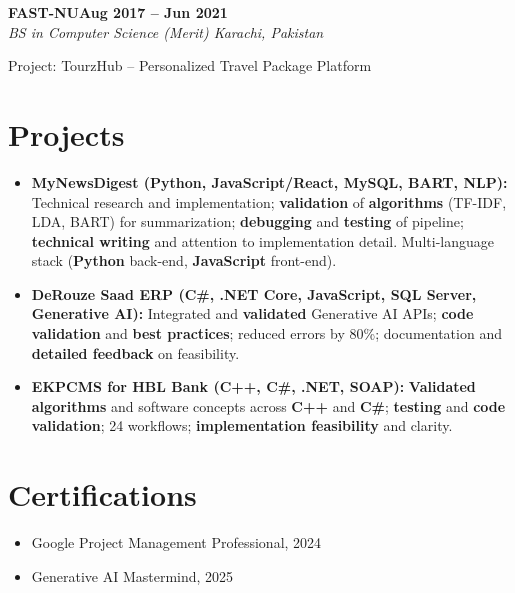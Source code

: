 \documentclass[letterpaper,10pt]{article}
\newcommand{\headingBf}[2]{
  \hspace{10pt}\textbf{#1}\hfill\textbf{#2}\\
}
\newcommand{\headingIt}[2]{
  \hspace{10pt}\textit{#1}\hfill\textit{#2}\\
}
\newenvironment{resume_list}{
  \vspace{-7pt}
  \begin{itemize}[itemsep=-2px, parsep=1pt, leftmargin=30pt]
}{
  \end{itemize}
}
\begin{document}
\headingBf{FAST-NU}{Aug 2017 -- Jun 2021}
\headingIt{BS in Computer Science (Merit) \hfill Karachi, Pakistan}{}
\begin{resume_list}
    \item Project: TourzHub -- Personalized Travel Package Platform
\end{resume_list}

\section{Projects}
\begin{itemize}
    \setlength\itemsep{3pt}
    \item \textbf{MyNewsDigest (\textbf{Python}, \textbf{JavaScript}/React, MySQL, BART, NLP):} Technical research and implementation; \textbf{validation} of \textbf{algorithms} (TF-IDF, LDA, BART) for summarization; \textbf{debugging} and \textbf{testing} of pipeline; \textbf{technical writing} and attention to implementation detail. Multi-language stack (\textbf{Python} back-end, \textbf{JavaScript} front-end).
    \item \textbf{DeRouze Saad ERP (C\#, .NET Core, JavaScript, SQL Server, \textbf{Generative AI}):} Integrated and \textbf{validated} Generative AI APIs; \textbf{code validation} and \textbf{best practices}; reduced errors by 80\%; documentation and \textbf{detailed feedback} on feasibility.
    \item \textbf{EKPCMS for HBL Bank (\textbf{C++}, C\#, .NET, SOAP):} \textbf{Validated} \textbf{algorithms} and software concepts across \textbf{C++} and \textbf{C\#}; \textbf{testing} and \textbf{code validation}; 24 workflows; \textbf{implementation feasibility} and clarity.
\end{itemize}

\section{Certifications}
\begin{itemize}
    \item Google Project Management Professional, 2024
    \item Generative AI Mastermind, 2025
\end{itemize}

\vspace*{\fill}
\end{document}
